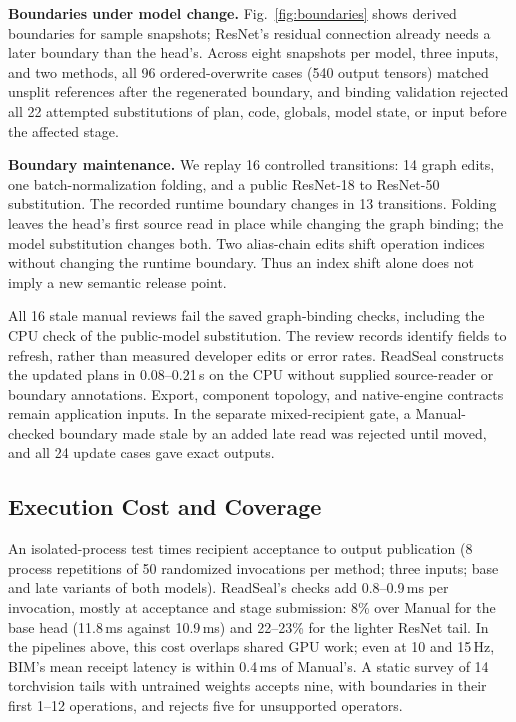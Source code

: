 \documentclass[conference]{IEEEtran}
\newcommand{\ms}{\,ms}
\newcommand{\Hz}{\,Hz}
\begin{document}
\textbf{Boundaries under model change.} Fig.~\ref{fig:boundaries} shows derived boundaries for sample snapshots; ResNet's residual connection already needs a later boundary than the head's. Across eight snapshots per model, three inputs, and two methods, all 96 ordered-overwrite cases (540 output tensors) matched unsplit references after the regenerated boundary, and binding validation rejected all 22 attempted substitutions of plan, code, globals, model state, or input before the affected stage.

\textbf{Boundary maintenance.} We replay 16 controlled transitions: 14 graph edits, one batch-normalization folding, and a public ResNet-18 to ResNet-50 substitution. The recorded runtime boundary changes in 13 transitions. Folding leaves the head's first source read in place while changing the graph binding; the model substitution changes both. Two alias-chain edits shift operation indices without changing the runtime boundary. Thus an index shift alone does not imply a new semantic release point.

All 16 stale manual reviews fail the saved graph-binding checks, including the CPU check of the public-model substitution. The review records identify fields to refresh, rather than measured developer edits or error rates. ReadSeal constructs the updated plans in 0.08--0.21\,s on the CPU without supplied source-reader or boundary annotations. Export, component topology, and native-engine contracts remain application inputs. In the separate mixed-recipient gate, a Manual-checked boundary made stale by an added late read was rejected until moved, and all 24 update cases gave exact outputs.

\subsection{Execution Cost and Coverage}
\label{sec:eval-cost}

An isolated-process test times recipient acceptance to output publication (8 process repetitions of 50 randomized invocations per method; three inputs; base and late variants of both models). ReadSeal's checks add 0.8--0.9\ms{} per invocation, mostly at acceptance and stage submission: 8\% over Manual for the base head (11.8\ms{} against 10.9\ms) and 22--23\% for the lighter ResNet tail. In the pipelines above, this cost overlaps shared GPU work; even at 10 and 15\Hz, BIM's mean receipt latency is within 0.4\ms{} of Manual's. A static survey of 14 torchvision tails with untrained weights accepts nine, with boundaries in their first 1--12 operations, and rejects five for unsupported operators.
\end{document}

